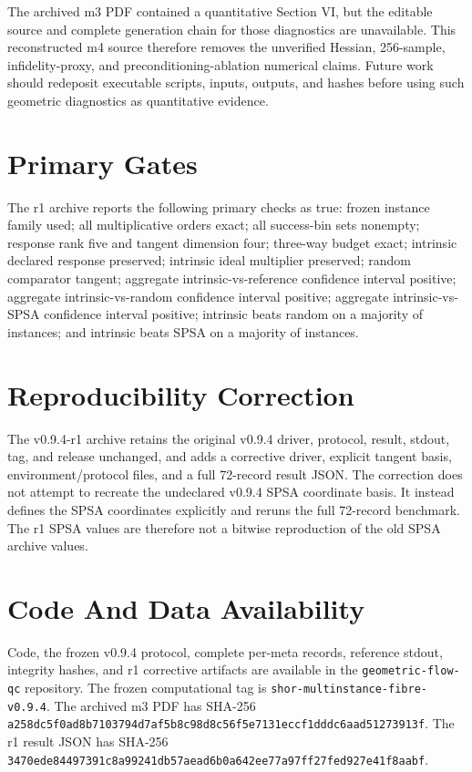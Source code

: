 \documentclass[11pt]{article}
\begin{document}
The archived m3 PDF contained a quantitative Section VI, but the editable
source and complete generation chain for those diagnostics are unavailable.
This reconstructed m4 source therefore removes the unverified Hessian,
256-sample, infidelity-proxy, and preconditioning-ablation numerical claims.
Future work should redeposit executable scripts, inputs, outputs, and hashes
before using such geometric diagnostics as quantitative evidence.

\appendix

\section{Primary Gates}

The r1 archive reports the following primary checks as true:
frozen instance family used; all multiplicative orders exact; all success-bin
sets nonempty; response rank five and tangent dimension four; three-way budget
exact; intrinsic declared response preserved; intrinsic ideal multiplier
preserved; random comparator tangent; aggregate intrinsic-vs-reference
confidence interval positive; aggregate intrinsic-vs-random confidence
interval positive; aggregate intrinsic-vs-SPSA confidence interval positive;
intrinsic beats random on a majority of instances; and intrinsic beats SPSA on
a majority of instances.

\section{Reproducibility Correction}

The v0.9.4-r1 archive retains the original v0.9.4 driver, protocol, result,
stdout, tag, and release unchanged, and adds a corrective driver, explicit
tangent basis, environment/protocol files, and a full 72-record result JSON.
The correction does not attempt to recreate the undeclared v0.9.4 SPSA
coordinate basis.  It instead defines the SPSA coordinates explicitly and
reruns the full 72-record benchmark.  The r1 SPSA values are therefore not a
bitwise reproduction of the old SPSA archive values.

\section{Code And Data Availability}

Code, the frozen v0.9.4 protocol, complete per-meta records, reference stdout,
integrity hashes, and r1 corrective artifacts are available in the
\texttt{geometric-flow-qc} repository.  The frozen computational tag is
\texttt{shor-multinstance-fibre-v0.9.4}.  The archived m3 PDF has SHA-256
\nolinkurl{a258dc5f0ad8b7103794d7af5b8c98d8c56f5e7131eccf1dddc6aad51273913f}.
The r1 result JSON has SHA-256
\nolinkurl{3470ede84497391c8a99241db57aead6b0a642ee77a97ff27fed927e41f8aabf}.
\end{document}
